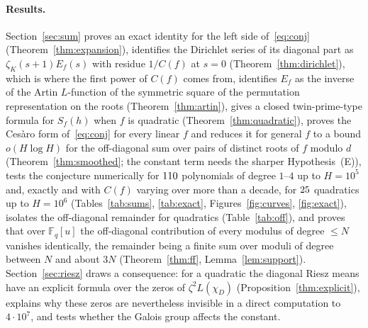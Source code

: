 \documentclass[11pt,a4paper]{article}
\theoremstyle{remark}\newtheorem{remark}[theorem]{Remark}
\newcommand{\F}{\mathbb{F}}
\begin{document}
\paragraph{Results.} Section~\ref{sec:sum} proves an exact identity for the left side
of~\eqref{eq:conj} (Theorem~\ref{thm:expansion}), identifies the Dirichlet series of its diagonal part
as $\zeta_K(s+1)E_f(s)$ with residue $1/C(f)$ at $s=0$ (Theorem~\ref{thm:dirichlet}), which is where
the first power of $C(f)$ comes from, identifies $E_f$ as the inverse of the Artin $L$-function of the
symmetric square of the permutation representation on the roots (Theorem~\ref{thm:artin}), gives a
closed twin-prime-type formula for $S_f(h)$ when $f$ is quadratic (Theorem~\ref{thm:quadratic}), proves
the Ces\`aro form of~\eqref{eq:conj} for every linear $f$ and reduces it for general $f$ to a bound
$o(H\log H)$ for the off-diagonal sum over pairs of distinct roots of $f$ modulo $d$
(Theorem~\ref{thm:smoothed}; the constant term needs the sharper Hypothesis~(E)), tests the conjecture
numerically for $110$ polynomials of degree $1$--$4$ up to $H=10^5$ and, exactly and with $C(f)$
varying over more than a decade, for $25$ quadratics up to $H=10^6$ (Tables~\ref{tab:sums},
\ref{tab:exact}, Figures~\ref{fig:curves}, \ref{fig:exact}), isolates the off-diagonal remainder for
quadratics (Table~\ref{tab:off}), and proves that over $\F_q[u]$ the off-diagonal contribution of every
modulus of degree $\le N$ vanishes identically, the remainder being a finite sum over moduli of degree
between $N$ and about $3N$ (Theorem~\ref{thm:ff}, Lemma~\ref{lem:support}). Section~\ref{sec:riesz}
draws a consequence: for a quadratic the diagonal Riesz means have an explicit formula over the zeros of
$\zeta^2L(\chi_D)$ (Proposition~\ref{thm:explicit}), explains why these zeros are nevertheless invisible
in a direct computation to $4\cdot10^7$, and tests whether the Galois group affects the constant.
\end{document}
